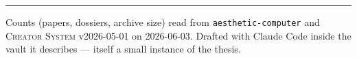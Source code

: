 \documentclass[10pt,letterpaper,twocolumn]{article}
\newcommand{\cs}{\textsc{Creator System}}
\begin{document}
\vspace{0.5em}
\noindent\rule{\columnwidth}{0.4pt}
\vspace{0.3em}

{\footnotesize\color{acgray}\noindent Counts (papers, dossiers, archive size) read from \texttt{aesthetic-computer} and \cs{} v2026-05-01 on 2026-06-03. Drafted with Claude Code inside the vault it describes --- itself a small instance of the thesis.}
\end{document}
